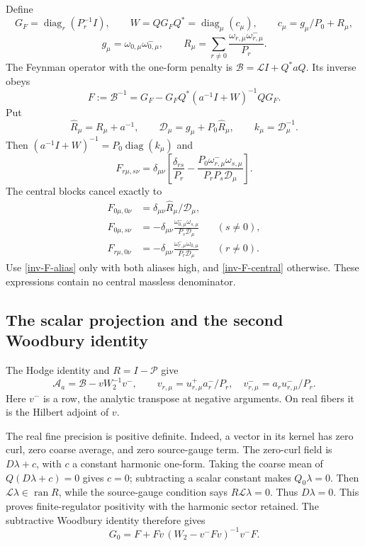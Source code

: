 \documentclass[11pt]{article}
\theoremstyle{remark}
\newcommand{\diag}{\operatorname{diag}}
\begin{document}
Define
\[
 G_F=\diag_r(P_r^{-1}I),\qquad
 W=QG_FQ^*=\diag_\mu(c_\mu),\qquad
 c_\mu=g_\mu/P_0+R_\mu,
\]
\[
 g_\mu=\omega_{0,\mu}\omega_{0,\mu}^-,\qquad
 R_\mu=\sum_{r\ne0}\frac{\omega_{r,\mu}\omega_{r,\mu}^-}{P_r}.
\]
The Feynman operator with the one-form penalty is
$\mathcal B=\mathcal L I+Q^*aQ$. Its inverse obeys
\begin{equation}\label{inv-F-woodbury}
 F:=\mathcal B^{-1}
 =G_F-G_FQ^*(a^{-1}I+W)^{-1}QG_F.
\end{equation}
Put
\begin{equation}\label{inv-Da}
 \widehat R_\mu=R_\mu+a^{-1},\qquad
 \mathcal D_\mu=g_\mu+P_0\widehat R_\mu,\qquad
 k_\mu=\mathcal D_\mu^{-1}.
\end{equation}
Then $(a^{-1}I+W)^{-1}=P_0\diag(k_\mu)$ and
\begin{equation}\label{inv-F-alias}
 F_{r\mu,s\nu}=\delta_{\mu\nu}
 \left[\frac{\delta_{rs}}{P_r}
 -\frac{P_0\omega_{r,\mu}^-\omega_{s,\mu}}
              {P_rP_s\mathcal D_\mu}\right].
\end{equation}
The central blocks cancel exactly to
\begin{align}
 F_{0\mu,0\nu}
 &=\delta_{\mu\nu}\widehat R_\mu/\mathcal D_\mu,
 \label{inv-F-central}\\
 F_{0\mu,s\nu}
 &=-\delta_{\mu\nu}
   \frac{\omega_{0,\mu}^-\omega_{s,\mu}}{P_s\mathcal D_\mu}
       &&(s\ne0),\nonumber\\
 F_{r\mu,0\nu}
 &=-\delta_{\mu\nu}
   \frac{\omega_{r,\mu}^-\omega_{0,\mu}}{P_r\mathcal D_\mu}
       &&(r\ne0).\nonumber
\end{align}
Use \eqref{inv-F-alias} only with both aliases high, and
\eqref{inv-F-central} otherwise. These expressions contain no
central massless denominator.

\subsection{The scalar projection and the second Woodbury identity}

The Hodge identity and $R=I-\mathcal P$ give
\begin{equation}\label{inv-rank-subtraction}
 \mathcal A_a=\mathcal B-vW_2^{-1}v^-,\qquad
 v_{r,\mu}=u_{r,\mu}^+a_r^-/P_r,
 \quad v_{r,\mu}^-=a_ru_{r,\mu}^-/P_r.
\end{equation}
Here $v^-$ is a row, the analytic transpose at negative arguments.
On real fibers it is the Hilbert adjoint of $v$.

The real fine precision is positive definite. Indeed, a vector in its
kernel has zero curl, zero coarse average, and zero source-gauge term.
The zero-curl field is $D\lambda+c$, with $c$ a constant harmonic
one-form. Taking the coarse mean of $Q(D\lambda+c)=0$ gives $c=0$;
subtracting a scalar constant makes $Q_0\lambda=0$. Then
$\mathcal L\lambda\in\operatorname{ran}R$, while the source-gauge
condition says $R\mathcal L\lambda=0$. Thus $D\lambda=0$.
This proves finite-regulator positivity with the harmonic sector
retained. The subtractive Woodbury identity therefore gives
\begin{equation}\label{inv-G-woodbury}
 G_0=F+Fv\,(W_2-v^-Fv)^{-1}v^-F.
\end{equation}
\end{document}

